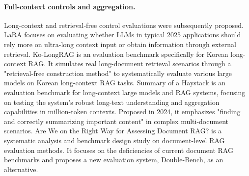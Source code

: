\paragraph{Full-context controls and aggregation.}
Long-context and retrieval-free control evaluations were subsequently proposed. LaRA \cite{lara2025} focuses on evaluating whether LLMs in typical 2025 applications should rely more on ultra-long context input or obtain information through external retrieval. Ko-LongRAG \cite{kolongrag2025} is an evaluation benchmark specifically for Korean long-context RAG. It simulates real long-document retrieval scenarios through a "retrieval-free construction method" to systematically evaluate various large models on Korean long-context RAG tasks. Summary of a Haystack \cite{summaryhaystack2024} is an evaluation benchmark for long-context large models and RAG systems, focusing on testing the system's robust long-text understanding and aggregation capabilities in million-token contexts. Proposed in 2024, it emphasizes "finding and correctly summarizing important content" in complex multi-document scenarios. Are We on the Right Way for Assessing Document RAG? \cite{rightwaydocumentrag2025} is a systematic analysis and benchmark design study on document-level RAG evaluation methods. It focuses on the deficiencies of current document RAG benchmarks and proposes a new evaluation system, Double-Bench, as an alternative.

